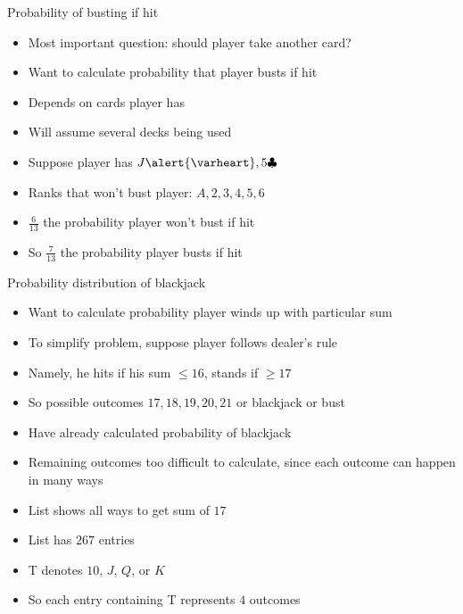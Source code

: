 \documentclass[handout]{beamer}
\theoremstyle{definition}
\newcommand{\hs}{\alert{\varheart}}
\newcommand{\cs}{\clubsuit}
\begin{document}
\begin{frame}{Probability of busting if hit}
\begin{itemize}
\item Most important question: should player take another card?
\item Want to calculate probability that player busts
if hit
\item Depends on cards player has
\item Will assume several decks being used
\end{itemize}
\begin{example}
\begin{itemize}
\item Suppose player has $J\hs,5\cs$
\item Ranks that \alert{won't} bust player:
$A,2,3,4,5,6$
\item $\frac{6}{13}$ the probability player won't bust if hit
\item So $\frac{7}{13}$ the probability player busts if hit
\end{itemize}
\end{example}
\end{frame}

\begin{frame}{Probability distribution of blackjack}
\begin{itemize}
\item Want to calculate probability player winds up with particular sum
\item To simplify problem, suppose player follows dealer's rule
\item Namely, he hits if his sum $\le 16$, stands if $\ge 17$
\item So possible outcomes $17,18,19,20,21$ or blackjack or bust
\item Have already calculated probability of blackjack
\item Remaining outcomes too difficult to calculate,
since each outcome can happen in many ways
\end{itemize}
\end{frame}

\begin{frame}
\begin{itemize}
\item List shows all ways to get sum of $17$
\item List has $267$ entries
\item \alert{T} denotes $10$, $J$, $Q$, or $K$
\item So each entry containing \alert{T}
represents $4$ outcomes
\end{itemize}

\end{frame}
\end{document}
